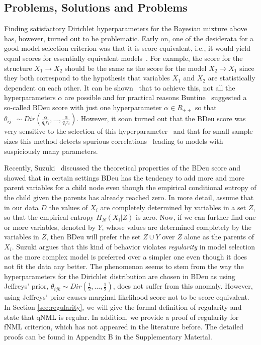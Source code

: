 \subsection {Problems, Solutions and Problems}

Finding satisfactory Dirichlet hyperparameters for the Bayesian
mixture above has, however, turned out to be problematic. Early on,
one of the desiderata for a good model selection criterion was that it
is score equivalent, i.e., it would yield equal scores for
essentially equivalent models~\cite{Verm90}.  For example, the score
for the structure $X_1\rightarrow X_2$ should be the same as the score
for the model $X_2 \rightarrow X_1$ since they both correspond to the
hypothesis that variables $X_1$ and $X_2$ are statistically dependent
on each other.  It can be shown~\cite{Heck95} that to achieve this,
not all the hyperparameters $\alpha$ are possible and for practical
reasons Buntine~\cite{Bunt91} suggested a so-called BDeu score with
just one hyperparameter $\alpha\in R_{++}$ so that
$\theta_{ij\cdot}\sim Dir(\frac{\alpha}{q_i
  r_i},\ldots,\frac{\alpha}{q_i r_i})$.  However, it soon turned out
that the BDeu score was very sensitive to the selection of this
hyperparameter~\cite{cosco.uai07} and that for small sample sizes this
method detects spurious correlations~\cite{Steck08} leading to models
with suspiciously many parameters.

Recently, Suzuki~\cite{Suzuki2017} discussed the theoretical
properties of the BDeu score and showed that in certain settings BDeu
has the tendency to add more and more parent variables for a child node
even though the empirical conditional entropy of the child given the
parents has already reached zero. In more detail, assume that in our
data $D$ the values of $X_i$ are completely determined by variables
in a set $Z$, so that the empirical entropy $H_N(X_i | Z)$ is zero. Now, if we can further
find one or more variables, denoted by $Y$, whose values are
determined completely by the variables in $Z$, then BDeu will prefer
the set $Z\cup Y$ over $Z$ alone as the parents of $X_i$. Suzuki
argues that this kind of behavior violates \textit{regularity} in model
selection as the more complex model is preferred over a simpler one
even though it does not fit the data any better. The phenomenon seems
to stem from the way the hyperparameters for the Dirichlet
distribution are chosen in BDeu as using Jeffreys' prior,
$\theta_{ijk}\sim Dir(\frac{1}{2},\ldots,\frac{1}{2})$, does not suffer
from this anomaly. However, using Jeffreys' prior causes marginal
likelihood score not to be score equivalent. In Section \ref{sec:regularity}, we will give the formal definition of regularity and state that qNML is regular. In addition, we provide a proof of regularity for fNML criterion, which has not appeared in the literature before. The detailed proofs can be found in Appendix B in the Supplementary Material.     

